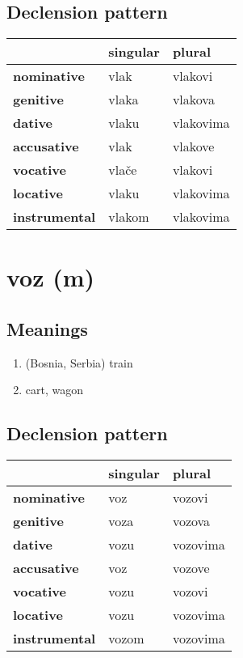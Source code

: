 \subsection*{Declension pattern}
\begin{tabularx}{\linewidth}{Xll}
\toprule
{} & singular &     plural \\
\midrule
\textbf{nominative  } &     vlak &    vlakovi \\
\textbf{genitive    } &    vlaka &    vlakova \\
\textbf{dative      } &    vlaku &  vlakovima \\
\textbf{accusative  } &     vlak &    vlakove \\
\textbf{vocative    } &    vlače &    vlakovi \\
\textbf{locative    } &    vlaku &  vlakovima \\
\textbf{instrumental} &   vlakom &  vlakovima \\
\bottomrule
\end{tabularx}

\filbreak
\section{voz (m)}
\subsection*{Meanings}
\begin{enumerate}
\item (Bosnia, Serbia) train
\item cart, wagon
\end{enumerate}
\subsection*{Declension pattern}
\begin{tabularx}{\linewidth}{Xll}
\toprule
{} & singular &    plural \\
\midrule
\textbf{nominative  } &      voz &    vozovi \\
\textbf{genitive    } &     voza &    vozova \\
\textbf{dative      } &     vozu &  vozovima \\
\textbf{accusative  } &      voz &    vozove \\
\textbf{vocative    } &     vozu &    vozovi \\
\textbf{locative    } &     vozu &  vozovima \\
\textbf{instrumental} &    vozom &  vozovima \\
\bottomrule
\end{tabularx}

